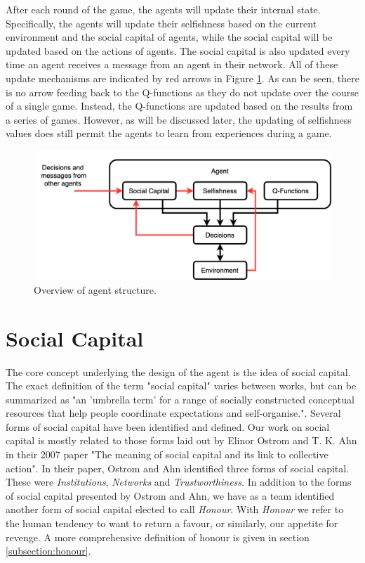 After each round of the game, the agents will update their internal state. Specifically, the agents will update their selfishness based on the current environment and the social capital of agents, while the social capital will be updated based on the actions of agents. The social capital is also updated every time an agent receives a message from an agent in their network. All of these update mechanisms are indicated by red arrows in Figure \ref{fig:agent_structure}. As can be seen, there is no arrow feeding back to the Q-functions as they do not update over the course of a single game. Instead, the Q-functions are updated based on the results from a series of games. However, as will be discussed later, the updating of selfishness values does still permit the agents to learn from experiences during a game.

\begin{figure}[!h]
    \centering
    \includegraphics[width=0.75\linewidth]{004_team_1_agent_design/images/agent_structure.png}
    \caption{Overview of agent structure.}
    \label{fig:agent_structure}
\end{figure}

\section{Social Capital}

The core concept underlying the design of the agent is the idea of social capital. The exact definition of the term "social capital" varies between works, but can be summarized as "an 'umbrella term' for a range of socially constructed conceptual resources that help people coordinate expectations and self-organise."\cite{pitt}. Several forms of social capital have been identified and defined. Our work on social capital is mostly related to those forms laid out by Elinor Ostrom and T. K. Ahn in their 2007 paper "The meaning of social capital and its link to collective action". \cite{ostrom-ahn} In their paper, Ostrom and Ahn identified three forms of social capital. These were \emph{Institutions}, \emph{Networks} and \emph{Trustworthiness}. In addition to the forms of social capital presented by Ostrom and Ahn, we have as a team identified another form of social capital elected to call \emph{Honour}. With \emph{Honour} we refer to the human tendency to want to return a favour, or similarly, our appetite for revenge. A more comprehensive definition of honour is given in section \ref{subsection:honour}. 

